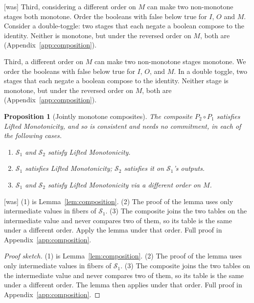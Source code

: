 \documentclass[sigconf]{cidr-2027}
\newtheorem{proposition}{Proposition}
\theoremstyle{remark}
\newcommand{\commitment}{commitment\xspace}
\newcommand{\Spec}{\mathcal{S}}
\begin{document}
{\footnotesize\color{black!50}\noindent\textsf{[was]} Third, considering a different order on $M$ can make two
non-monotone stages both monotone.  Order the booleans with false below
true for $I$, $O$ and $M$.  Consider a double-toggle: two stages that
each negate a boolean compose to the identity. Neither is monotone, but under the reversed order on
$M$, both are (Appendix~\ref{app:composition}).\par}

\color{blue!70!black}Third, a different order on $M$ can make two non-monotone stages monotone.
We order the booleans with false below true for $I$, $O$, and $M$.  In a
double toggle, two stages that each negate a boolean compose to the identity.
Neither stage is monotone, but under the reversed order on $M$, both are
(Appendix~\ref{app:composition}).\color{black}

\begin{proposition}[Jointly monotone composites]
\label{prop:joint-monotone}
The composite $P_2\circ P_1$ satisfies Lifted Monotonicity, and so is
consistent and needs no \commitment, in each of the following cases.
\begin{enumerate}
  \item $\Spec_1$ and $\Spec_2$ satisfy Lifted Monotonicity.
  \item $\Spec_1$ satisfies Lifted Monotonicity; $\Spec_2$ satisfies it on
        $\Spec_1$'s outputs.
  \item $\Spec_1$ and $\Spec_2$ satisfy Lifted Monotonicity via a different order
        on $M$.
\end{enumerate}
\end{proposition}



{\footnotesize\color{black!50}\noindent\textsf{[was]} (1) is Lemma~\ref{lem:composition}.  (2) The proof of the lemma uses only
intermediate values in fibers of $\Spec_1$.  (3) The composite joins the two
tables on the intermediate value and never compares two of them, so its table
is the same under a different order.  Apply the lemma under that order.  Full
proof in Appendix~\ref{app:composition}.\par}

\color{blue!70!black}\begin{proof}[Proof sketch]
(1) is Lemma~\ref{lem:composition}.  (2) The proof of the lemma uses only
intermediate values in fibers of $\Spec_1$.  (3) The composite joins the two
tables on the intermediate value and never compares two of them, so its table
is the same under a different order.  The lemma then applies under that order.  Full
proof in Appendix~\ref{app:composition}.\color{black}
\end{proof}
\end{document}

